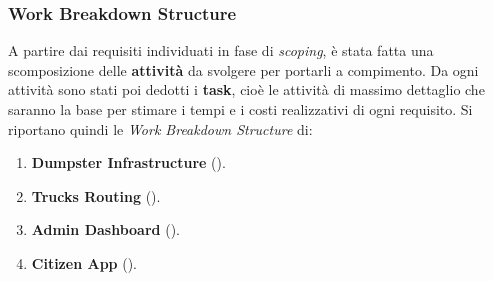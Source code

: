 \subsubsection{Work Breakdown Structure}
A partire dai requisiti individuati in fase di \textit{scoping}, è stata fatta una scomposizione delle \textbf{attività} da svolgere per portarli a compimento. Da ogni attività sono stati poi dedotti i \textbf{task}, cioè le attività di massimo dettaglio che saranno la base per stimare i tempi e i costi realizzativi di ogni requisito.
Si riportano quindi le \textit{Work Breakdown Structure} di:
\begin{enumerate}
    \item \textbf{Dumpster Infrastructure} ().
    \item \textbf{Trucks Routing} ().
    \item \textbf{Admin Dashboard} ().
    \item \textbf{Citizen App} ().
\end{enumerate}